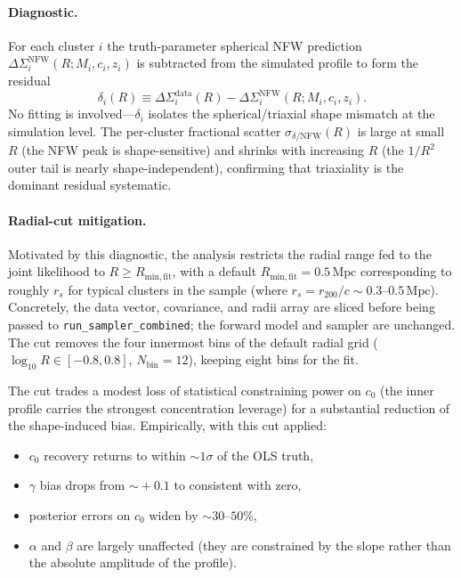 \documentclass[12pt,a4paper]{article}
\begin{document}
\paragraph{Diagnostic.}
For each cluster $i$ the truth-parameter spherical NFW prediction
$\Delta\Sigma_i^\mathrm{NFW}(R;M_i,c_i,z_i)$ is subtracted from the simulated
profile to form the residual
\begin{equation}
  \delta_i(R) \equiv \Delta\Sigma_i^\mathrm{data}(R) - \Delta\Sigma_i^\mathrm{NFW}(R;M_i,c_i,z_i).
\end{equation}
No fitting is involved—$\delta_i$ isolates the spherical/triaxial shape mismatch
at the simulation level.  The per-cluster fractional scatter
$\sigma_{\delta/\mathrm{NFW}}(R)$ is large at small $R$ (the NFW peak is
shape-sensitive) and shrinks with increasing $R$ (the $1/R^2$ outer tail is
nearly shape-independent), confirming that triaxiality is the dominant residual
systematic.

\paragraph{Radial-cut mitigation.}
Motivated by this diagnostic, the analysis restricts the radial range fed to the
joint likelihood to $R \ge R_\mathrm{min,fit}$, with a default
$R_\mathrm{min,fit}=0.5\,\mathrm{Mpc}$ corresponding to roughly $r_s$ for typical
clusters in the sample (where $r_s = r_{200}/c \sim 0.3$--$0.5\,\mathrm{Mpc}$).
Concretely, the data vector, covariance, and radii array are sliced before being
passed to \texttt{run\_sampler\_combined}; the forward model and sampler are
unchanged.  The cut removes the four innermost bins of the default radial grid
($\log_{10}R\in[-0.8, 0.8]$, $N_\mathrm{bin}=12$), keeping eight bins for the fit.

The cut trades a modest loss of statistical constraining power on $c_0$ (the
inner profile carries the strongest concentration leverage) for a substantial
reduction of the shape-induced bias.  Empirically, with this cut applied:
\begin{itemize}
  \item $c_0$ recovery returns to within $\sim\!1\sigma$ of the OLS truth,
  \item $\gamma$ bias drops from $\sim\!+0.1$ to consistent with zero,
  \item posterior errors on $c_0$ widen by $\sim\!30$--$50\%$,
  \item $\alpha$ and $\beta$ are largely unaffected (they are constrained by
    the slope rather than the absolute amplitude of the profile).
\end{itemize}
\end{document}
